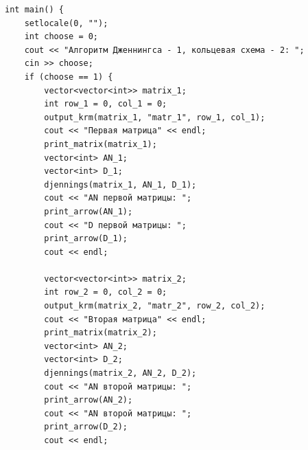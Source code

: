 \documentclass[12pt, a4paper]{article}
\begin{document}
\begin{lstlisting}[caption={Исходный код программы для работы со схемой Дженнингса или с кольцевой схемой},label={lst:label1}]
int main() {
	setlocale(0, "");
	int choose = 0;
	cout << "Алгоритм Дженнингса - 1, кольцевая схема - 2: ";
	cin >> choose;
	if (choose == 1) {
		vector<vector<int>> matrix_1;
		int row_1 = 0, col_1 = 0;
		output_krm(matrix_1, "matr_1", row_1, col_1);
		cout << "Первая матрица" << endl;
		print_matrix(matrix_1);
		vector<int> AN_1;
		vector<int> D_1;
		djennings(matrix_1, AN_1, D_1);
		cout << "AN первой матрицы: ";
		print_arrow(AN_1);
		cout << "D первой матрицы: ";
		print_arrow(D_1);
		cout << endl;

		vector<vector<int>> matrix_2;
		int row_2 = 0, col_2 = 0;
		output_krm(matrix_2, "matr_2", row_2, col_2);
		cout << "Вторая матрица" << endl;
		print_matrix(matrix_2);
		vector<int> AN_2;
		vector<int> D_2;
		djennings(matrix_2, AN_2, D_2);
		cout << "AN второй матрицы: ";
		print_arrow(AN_2);
		cout << "AN второй матрицы: ";
		print_arrow(D_2);
		cout << endl;


\end{lstlisting}
\end{document}
